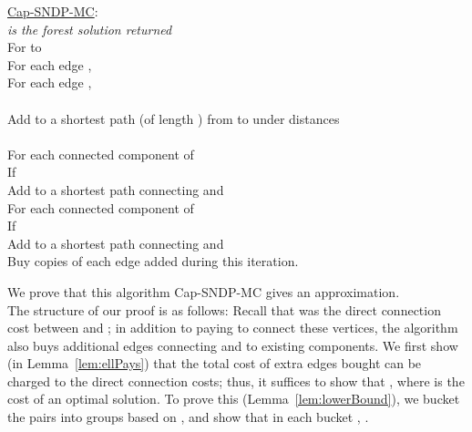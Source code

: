 \documentclass[11pt]{article}
\def\Comment#1{\textsl{#1\/}}
\newcounter{thm0Rcopies}
\newcounter{thm_saved}
\begin{document}
\begin{algo}
  \underline{\sc Cap-SNDP-MC}:\\
   \hspace{2.26in}\Comment{ is the forest
    solution returned} \\
  For  to  \+ \\
    For each edge ,  \\
    For each edge ,  \\
     \\
    Add to  a shortest path (of length ) from  to
     under distances  \\
     \\
    For each connected component  of  \+ \\
      If  \+ \\
        Add to  a shortest path connecting  and  \- \- \\
    For each connected component  of  \+ \\
      If  \+ \\
        Add to  a shortest path connecting  and  \- \- \\       
    Buy  copies of each edge  added during this iteration. \-
\end{algo}
\iffalse
Note that though the forest  may change several times during a
single iteration  of the outer loop, the costs  are fixed
at the beginning of each iteration. Also, the components of  may
change during the final loops; thus, these loops run over the
components that have not been merged with the component containing
 and .
\fi
We prove that this algorithm {\sc Cap-SNDP-MC} gives an 
approximation. \\

\noindent
The structure of our proof is as follows: Recall that  was the
direct connection cost between  and ; in addition to paying
 to connect these vertices, the algorithm also buys additional
edges connecting  and  to existing components. We first show
(in Lemma~\ref{lem:ellPays}) that the total cost of extra edges bought
can be charged to the direct connection costs; thus, it suffices to
show that , where  is the cost
of an optimal solution.  To prove this (Lemma~\ref{lem:lowerBound}),
we bucket the pairs  into  groups based on
, and show that in each bucket , .
\end{document}
